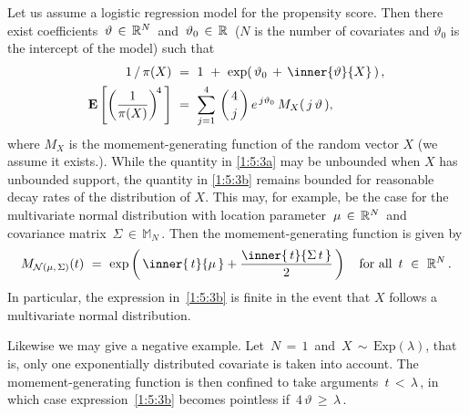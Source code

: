 \begin{example*}
  Let us assume a logistic regression model for the propensity score.
  Then there exist coefficients $\,\vartheta \,\in\,  \mathbb{R}^N\,$ and $\,\vartheta_0\,\in\, \mathbb{R}\,$ ($N$ is the number of covariates and $\vartheta_0$ is the intercept of the model) such that
  \begin{align}
    \label{1:5:3a}
    1\,/\,\pi(X)
    &
    \ 
    =
    \ 
    1
    \ 
    +
    \ 
    \exp(
    \,
    \vartheta_0
    \, 
    +
    \,
    \inner{\vartheta}{X}
    \,
    )
    \,,
    \\
    \label{1:5:3b}
  \E \left[ 
    \left(
      \frac{1}{\pi(X)}
    \right)^{\!4}
    \,
  \right]
    &
    \ 
    =
    \ 
  \sum_{j=1}^{4} 
  \,
    \binom{\,4\,}{j}
    \,
    e^{\,j \vartheta_0}
    \,
    M_X(\,j\,\vartheta\,)
    ,
  \end{align}
  where $M_X$ is the momement-generating function of the random vector $X$ (we assume it exists.).
   While the quantity in \eqref{1:5:3a}
   may be unbounded when $X$ has unbounded support, the quantity in \eqref{1:5:3b} remains bounded for reasonable decay rates of the distribution of $X$.
   This may, for example, be the case for the multivariate normal distribution with location parameter $\,\mu\,\in\,\mathbb{R}^N\,$ and covariance matrix 
   $\,\Sigma\,\in\, \mathbb{M}_N\,$. Then the momement-generating function is given by
   \begin{gather*}
     M_{\mathcal{N}(\mu,\,\Sigma)}
     (t)
     \ 
     =
     \ 
     \exp
     \left( 
       \,
       \inner{\,t}{\mu\,}
       +
       \frac{
       \inner{\,t}{\Sigma \,t\,}
       }{2}
       \,
     \right)
     \quad
     \text{for all}\ 
     \,t\ \in\ \R^N
     \,.
   \end{gather*}
   In particular, the expression in~\eqref{1:5:3b} is finite in the event that $X$ follows a multivariate normal distribution.

   Likewise we may give a negative example.
   Let $\,N\,=\,1\,$ and $\,X\,\sim\, \mathrm{Exp}(\lambda)$, that is, only one exponentially distributed covariate is taken into account.
   The momement-generating function is then confined to take arguments $\,t\,<\,\lambda\,$, in which case expression~\eqref{1:5:3b} becomes pointless if $\,4\,\vartheta\,\ge\, \lambda\,$.
\end{example*}

